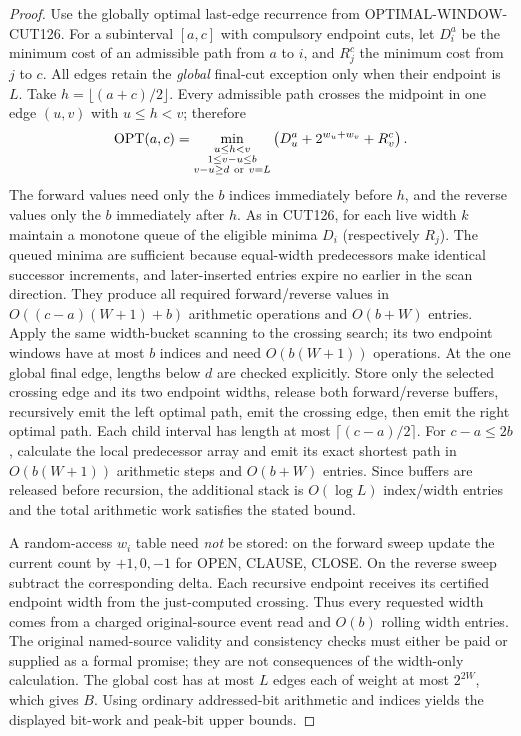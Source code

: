 \documentclass[11pt]{article}
\begin{document}
\begin{proof}
Use the globally optimal last-edge recurrence from OPTIMAL-WINDOW-CUT126. For a subinterval $[a,c]$ with compulsory endpoint cuts, let $D^a_i$ be the minimum cost of an admissible path from $a$ to $i$, and $R^c_j$ the minimum cost from $j$ to $c$. All edges retain the \emph{global} final-cut exception only when their endpoint is $L$. Take $h=\lfloor(a+c)/2\rfloor$. Every admissible path crosses the midpoint in one edge $(u,v)$ with $u\le h<v$; therefore
\[
\operatorname{OPT}(a,c)=
\min_{\substack{u\le h<v\\1\le v-u\le b\\v-u\ge d\ {\rm or}\ v=L}}
\left(D^a_u+2^{w_u+w_v}+R^c_v\right).
\]
The forward values need only the $b$ indices immediately before $h$, and the reverse values only the $b$ immediately after $h$. As in CUT126, for each live width $k$ maintain a monotone queue of the eligible minima $D_i$ (respectively $R_j$). The queued minima are sufficient because equal-width predecessors make identical successor increments, and later-inserted entries expire no earlier in the scan direction. They produce all required forward/reverse values in $O((c-a)(W+1)+b)$ arithmetic operations and $O(b+W)$ entries. Apply the same width-bucket scanning to the crossing search; its two endpoint windows have at most $b$ indices and need $O(b(W+1))$ operations. At the one global final edge, lengths below $d$ are checked explicitly. Store only the selected crossing edge and its two endpoint widths, release both forward/reverse buffers, recursively emit the left optimal path, emit the crossing edge, then emit the right optimal path. Each child interval has length at most $\lceil(c-a)/2\rceil$. For $c-a\le2b$, calculate the local predecessor array and emit its exact shortest path in $O(b(W+1))$ arithmetic steps and $O(b+W)$ entries. Since buffers are released before recursion, the additional stack is $O(\log L)$ index/width entries and the total arithmetic work satisfies the stated bound.

A random-access $w_i$ table need \emph{not} be stored: on the forward sweep update the current count by $+1,0,-1$ for OPEN, CLAUSE, CLOSE. On the reverse sweep subtract the corresponding delta. Each recursive endpoint receives its certified endpoint width from the just-computed crossing. Thus every requested width comes from a charged original-source event read and $O(b)$ rolling width entries. The original named-source validity and consistency checks must either be paid or supplied as a formal promise; they are not consequences of the width-only calculation. The global cost has at most $L$ edges each of weight at most $2^{2W}$, which gives $B$. Using ordinary addressed-bit arithmetic and indices yields the displayed bit-work and peak-bit upper bounds.
\end{proof}
\end{document}
